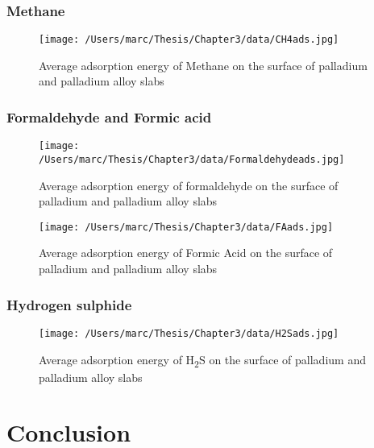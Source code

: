 \subsubsection{Methane}
\begin{landscape}
  \begin{figure}
      \centering
      \texttt{[image: /Users/marc/Thesis/Chapter3/data/CH4ads.jpg]}
      \caption{Average adsorption energy of Methane on the surface of palladium and palladium alloy slabs}
      \label{CH4ads}
    \end{figure}
  
  \end{landscape}
\subsubsection{Formaldehyde and Formic acid}
\begin{landscape}
  \begin{figure}
      \centering
      \texttt{[image: /Users/marc/Thesis/Chapter3/data/Formaldehydeads.jpg]}
      \caption{Average adsorption energy of formaldehyde on the surface of palladium and palladium alloy slabs}
      \label{formaldehydeads}
    \end{figure}
  
  \end{landscape}

\begin{landscape}
  \begin{figure}
      \centering
      \texttt{[image: /Users/marc/Thesis/Chapter3/data/FAads.jpg]}
      \caption{Average adsorption energy of Formic Acid on the surface of palladium and palladium alloy slabs}
      \label{FAads}
    \end{figure}
  
  \end{landscape}
\subsubsection{Hydrogen sulphide}
\begin{landscape}

\begin{figure}
    \centering
    \texttt{[image: /Users/marc/Thesis/Chapter3/data/H2Sads.jpg]}
    \caption{Average adsorption energy of H\textsubscript{2}S on the surface of palladium and palladium alloy slabs}
    \label{h2sads}
  \end{figure}
\end{landscape}


\section{Conclusion}

